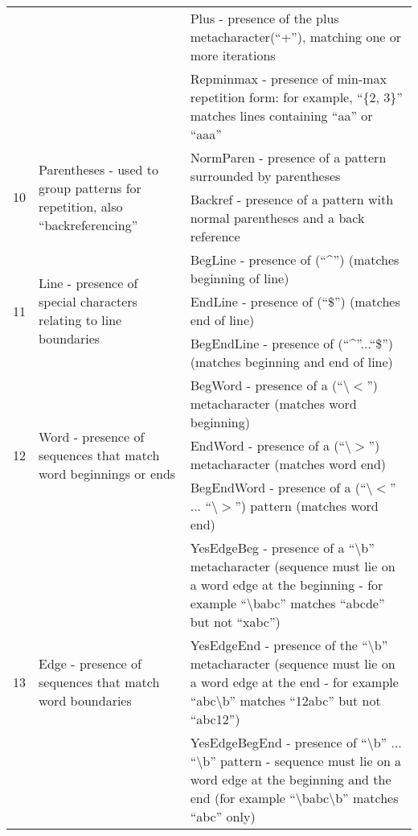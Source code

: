 \documentclass[a4paper,12pt]{article}
\newcommand{\mrt}[2]{\multirow{#1}{6cm}{#2}}
\newcommand{\mrn}[2]{\multirow{#1}{*}{#2}}
\begin{document}
\begin{longtable}{|l|p{6cm}|p{6cm}|}
                      && Plus - presence of the plus metacharacter(``+''), matching one or more iterations \\ \cline{3-3}
                      && Repminmax - presence of min-max repetition form: for example,  ``\{2, 3\}''  matches lines containing ``aa'' or ``aaa''  \\ \hline
\mrn{2}{10} & \mrt{2}{Parentheses - used to group patterns for repetition, also ``backreferencing''}                      & NormParen - presence of a pattern surrounded by parentheses  \\ \cline{3-3}
                      && Backref - presence of a pattern with normal parentheses and a back reference \\  \hline
\mrn{3}{11} & \mrt{3}{Line - presence of special characters relating to line boundaries} & BegLine - presence of (``\textasciicircum'') (matches beginning of line) \\ \cline{3-3}
                      && EndLine - presence of (``\$'') (matches end of line)     \\ \cline{3-3}
                      && BegEndLine - presence of (``\textasciicircum''...``\$'') (matches beginning and end of line)  \\ \cline{3-3} \hline
\mrn{3}{12} & \mrt{3}{Word - presence of sequences that match word beginnings or ends} & BegWord - presence of a (``\textbackslash $<$'') metacharacter (matches word beginning) \\ \cline{3-3}
                      && EndWord - presence of a (``\textbackslash $>$'') metacharacter (matches word end)   \\ \cline{3-3}
                      && BegEndWord - presence of a (``\textbackslash $<$'' ... ``\textbackslash $>$'') pattern  (matches word end) \\ \hline 
\mrn{6}{13} & \mrt{6}{Edge - presence of sequences that match word boundaries} & YesEdgeBeg - presence of a ``\textbackslash b'' metacharacter (sequence must lie on a word edge at the beginning - for example  ``\textbackslash babc'' matches ``abcde'' but not ``xabc'') \\ \cline{3-3}
                      && YesEdgeEnd - presence of the ``\textbackslash b'' metacharacter (sequence must lie on a word edge at the end - for example ``abc\textbackslash b'' matches ``12abc'' but not ``abc12'')  \\ \cline{3-3}
                      && YesEdgeBegEnd - presence of ``\textbackslash b'' ... ``\textbackslash b'' pattern - sequence must lie on a word edge at the beginning and the end (for example ``\textbackslash babc\textbackslash b'' matches ``abc'' only)  \\ \cline{3-3}

\end{longtable}
\end{document}
